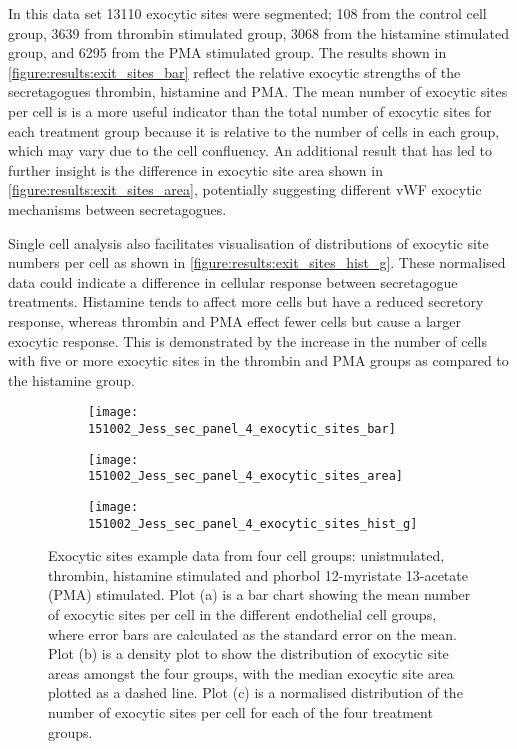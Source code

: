 In this data set 13110 exocytic sites were segmented; 108 from the control cell group, 3639 from thrombin stimulated group, 3068 from the histamine stimulated group, and 6295 from the PMA stimulated group. The results shown in \autoref{figure:results:exit_sites_bar} reflect the relative exocytic strengths of the secretagogues thrombin, histamine and PMA. The mean number of exocytic sites per cell is is a more useful indicator than the total number of exocytic sites for each treatment group because it is relative to the number of cells in each group, which may vary due to the cell confluency. An additional result that has led to further insight is the difference in exocytic site area shown in \autoref{figure:results:exit_sites_area}, potentially suggesting different vWF exocytic mechanisms between secretagogues.

Single cell analysis also facilitates visualisation of distributions of exocytic site numbers per cell as shown in \autoref{figure:results:exit_sites_hist_g}. These normalised data could indicate a difference in cellular response between secretagogue treatments. Histamine tends to affect more cells but have a reduced secretory response, whereas thrombin and PMA effect fewer cells but cause a larger exocytic response. This is demonstrated by the increase in the number of cells with five or more exocytic sites in the thrombin and PMA groups as compared to the histamine group.

\begin{figure}[htbp]\centering
	\begin{subfigure}[b]{0.43\linewidth}
		\centering
		\texttt{[image: 151002\_Jess\_sec\_panel\_4\_exocytic\_sites\_bar]}
		\caption{}
		\label{figure:results:exit_sites_bar}
		\vspace{1ex}
	\end{subfigure}\hfill
	\begin{subfigure}[b]{0.43\linewidth}
		\centering
		\texttt{[image: 151002\_Jess\_sec\_panel\_4\_exocytic\_sites\_area]}
		\caption{}
		\label{figure:results:exit_sites_area}
		\vspace{1ex}
	\end{subfigure}
	\begin{subfigure}[b]{\linewidth}
		\centering
		\texttt{[image: 151002\_Jess\_sec\_panel\_4\_exocytic\_sites\_hist\_g]}
		\caption{}
		\label{figure:results:exit_sites_hist_g}
		\vspace{1ex}
	\end{subfigure}\hfill
\caption[Results example from vWF exocytic sites]{Exocytic sites example data from four cell groups: unistmulated, thrombin, histamine stimulated and phorbol 12-myristate 13-acetate (PMA) stimulated. Plot (a) is a bar chart showing the mean number of exocytic sites per cell in the different endothelial cell groups, where error bars are calculated as the standard error on the mean. Plot (b) is a density plot to show the distribution of exocytic site areas amongst the four groups, with the median exocytic site area plotted as a dashed line. Plot (c) is a normalised distribution of the number of exocytic sites per cell for each of the four treatment groups.}
\label{figure:results:exit_sites}
\end{figure}

